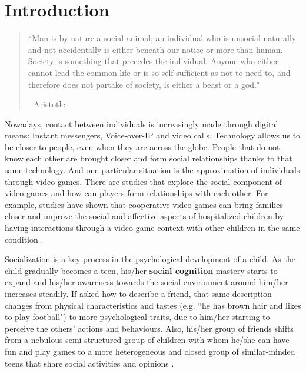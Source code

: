 \section{Introduction}
\label{sec:intro}

\begin{quotation}
``Man is by nature a social animal; an individual who is unsocial naturally and not accidentally is either beneath our notice or more than human. Society is something that precedes the individual. Anyone who either cannot lead the common life or is so self-sufficient as not to need to, and therefore does not partake of society, is either a beast or a god."
\par - Aristotle.
\end{quotation}

\par Nowadays, contact between individuals is increasingly made through digital means: Instant messengers, Voice-over-IP and video calls. Technology allows us to be closer to people, even when they are across the globe. People that do not know each other are brought closer and form social relationships thanks to that same technology. And one particular situation is the approximation of individuals through video games. There are studies that explore the social component of video games and how can players form relationships with each other. For example, studies have shown that cooperative video games can bring families closer \cite{wang_taylor_sun_2018} and improve the social and affective aspects of hospitalized children by having interactions through a video game context with other children in the same condition \cite{gonzalez-gonzalez_toledo-delgado_collazos-ordonez_gonzalez-sanchez_2014}. 
\par Socialization is a key process in the psychological development of a child. As the child gradually becomes a teen, his/her \textbf{social cognition} mastery starts to expand and his/her awareness towards the social environment around him/her increases steadily. If asked how to describe a friend, that same description changes from physical characteristics and tastes (e.g. ``he has brown hair and likes to play football") to more psychological traits, due to him/her starting to perceive the others' actions and behaviours. Also, his/her group of friends shifts from a nebulous semi-structured group of children with whom he/she can have fun and play games to a more heterogeneous and closed group of similar-minded teens that share social activities and opinions \cite{campos_1990}. 
